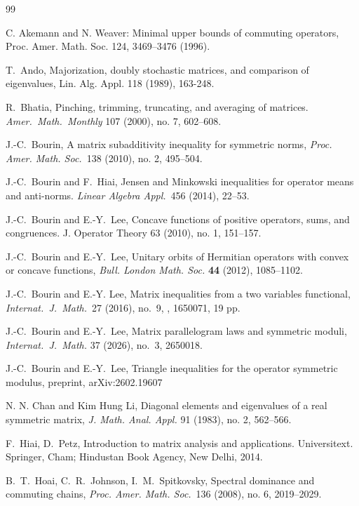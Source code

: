 \documentclass[12pt,reqno]{article}
\theoremstyle{definition}
\theoremstyle{remark}
\numberwithin{equation}{section}
\begin{document}
\begin{thebibliography}{99}
{\small

 C. Akemann and N. Weaver: Minimal upper bounds of commuting operators,
Proc. Amer. Math. Soc. 124, 3469–3476 (1996).

T.\ Ando, Majorization, doubly stochastic matrices, and comparison of eigenvalues, Lin. Alg.
Appl. 118 (1989), 163-248.

   R.\ Bhatia, Pinching, trimming, truncating, and averaging of matrices. {\it Amer.\ Math.\ Monthly}  107  (2000),  no. 7, 602--608. 



 J.-C.\ Bourin,  A matrix subadditivity inequality for symmetric norms, {\it Proc. Amer. Math. Soc.}\ 138 (2010), no. 2, 495–504.

 J.-C.\ Bourin and F.\ Hiai,
 Jensen and Minkowski inequalities for operator means and anti-norms. {\it Linear Algebra Appl.}\ 456 (2014), 22–53. 


 J.-C.\ Bourin and E.-Y.\ Lee, Concave functions of positive operators, sums, and congruences. J. Operator Theory 63 (2010), no. 1, 151–157.


J.-C.\ Bourin and E.-Y.\ Lee, Unitary orbits of Hermitian operators with convex
or concave functions, {\it Bull. London Math. Soc.} {\bf 44} (2012),
1085--1102.

 J.-C.\ Bourin and E.-Y. Lee, 
 Matrix inequalities from a two variables functional, {\it Internat.\ J.\ Math.}\ 27 (2016), no.\ 9, , 1650071, 19 pp.


 J.-C.\ Bourin and E.-Y.\ Lee, Matrix parallelogram laws and symmetric moduli, {\it Internat.\ J.\ Math.} 37
(2026), no.\ 3, 2650018.

 J.-C.\ Bourin and E.-Y.\ Lee, Triangle inequalities for the operator symmetric modulus, preprint, arXiv:2602.19607

 N. N. Chan and  Kim Hung Li, Diagonal elements and eigenvalues of a real symmetric matrix, {\it J. Math. Anal. Appl.} 91 (1983), no. 2, 562–566.

 F.\ Hiai, D.\ Petz, Introduction to matrix analysis and applications. Universitext. Springer, Cham; Hindustan Book Agency, New Delhi, 2014.

B.\  T.\ Hoai, C.\ R.\ Johnson, I.\ M.\ Spitkovsky, Spectral dominance and commuting chains, {\it Proc. Amer. Math. Soc.}\ 136 (2008), no. 6, 2019–2029. 

}
\end{thebibliography}
\end{document}
